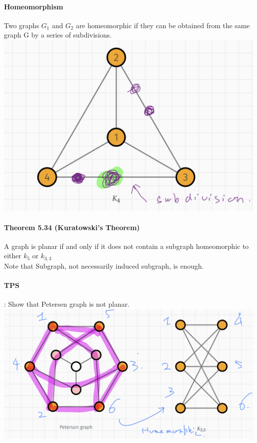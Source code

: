 \documentclass{article}
\begin{document}
\paragraph{Homeomorphism}
Two graphs $G_1$ and $G_2$ are homeomorphic if they can be obtained from the same graph G by a series of subdivisions.\\
\includegraphics{0107}
\paragraph{Theorem 5.34 (Kuratowski’s Theorem)}
A graph is planar if and only if it does not contain a subgraph homeomorphic to either $k_5$ or $k_{3,3}$\\
Note that Subgraph, not necessarily induced subgraph, is enough.
\paragraph{TPS}:
Show that Petersen graph is not planar.\\
\includegraphics{0109}
\end{document}
